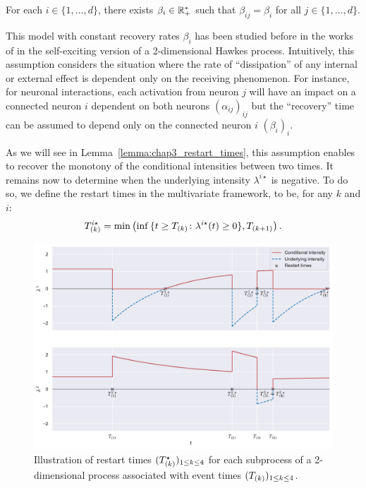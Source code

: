     \begin{assumption}\label{assu:chap3_beta}
    For each $i\in\{1,\ldots, d\}$, there exists $\beta_i\in\RR_+^*$ such that $\beta_{ij} = \beta_i$ for all $j\in\{1,\ldots, d\}$.
    \end{assumption}

    \begin{remark} This model with constant recovery rates $\beta_i$ has been studied before in the works of \textcite{Ogata1981} in the self-exciting version of a 2-dimensional Hawkes process. Intuitively, this assumption considers the situation where the rate of ``dissipation'' of any internal or external effect is dependent only on the receiving phenomenon. For instance, for neuronal interactions, each activation from neuron $j$ will have an impact on a connected neuron $i$ dependent on both neurons $(\alpha_{ij})_{ij}$ but the ``recovery'' time can be assumed to depend only on the connected neuron $i$ \((\beta_{i})_i\).
    \end{remark}

    As we will see in Lemma~\ref{lemma:chap3_restart_times}, this assumption enables to recover the monotony of the conditional intensities between two times.
    It remains now to determine when the underlying intensity \(\lambda^{i\star}\) is negative.
    To do so, we define the restart times in the multivariate framework, to be,
    for any \(k\) and \(i\):
    \[T\park^{i\star} = \min\adaptedpar{\inf{\{t\geq T\park \colon \lambda^{i\star}(t) \geq 0\}}, T\park[k+1]}.\]
    
    {\begin{figure}[!ht]
    \centering
    \includegraphics[width=0.8\linewidth]{images/chapter3/restarTimesMarkedMulti.pdf}
    \caption{Illustration of restart times $(T\park^{\star})_{1\leq k \leq 4}$ for each subprocess of a 2-dimensional process associated with event times $(T\park[k])_{1\leq k \leq 4}$.}
    \label{fig:chap3_restarttimes}
    \end{figure}}
    
